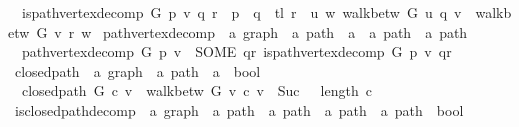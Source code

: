 \begin{isabellebody}
\ \ {\isachardoublequoteopen}is{\isacharunderscore}{\kern0pt}path{\isacharunderscore}{\kern0pt}vertex{\isacharunderscore}{\kern0pt}decomp\ G\ p\ v\ {\isacharparenleft}{\kern0pt}q{\isacharcomma}{\kern0pt}\ r{\isacharparenright}{\kern0pt}\ {\isasymlongleftrightarrow}\ p\ {\isacharequal}{\kern0pt}\ q\ {\isacharat}{\kern0pt}\ tl\ r\ {\isasymand}\ {\isacharparenleft}{\kern0pt}{\isasymexists}u\ w{\isachardot}{\kern0pt}\ walk{\isacharunderscore}{\kern0pt}betw\ G\ u\ q\ v\ {\isasymand}\ walk{\isacharunderscore}{\kern0pt}betw\ G\ v\ r\ w{\isacharparenright}{\kern0pt}{\isachardoublequoteclose}\isanewline
\isanewline
{}\isamarkupfalse%
\ path{\isacharunderscore}{\kern0pt}vertex{\isacharunderscore}{\kern0pt}decomp\ {\isacharcolon}{\kern0pt}{\isacharcolon}{\kern0pt}\ {\isachardoublequoteopen}{\isacharprime}{\kern0pt}a\ graph\ {\isasymRightarrow}\ {\isacharprime}{\kern0pt}a\ path\ {\isasymRightarrow}\ {\isacharprime}{\kern0pt}a\ {\isasymRightarrow}\ {\isacharprime}{\kern0pt}a\ path\ {\isasymtimes}\ {\isacharprime}{\kern0pt}a\ path{\isachardoublequoteclose}\ \isanewline
\ \ {\isachardoublequoteopen}path{\isacharunderscore}{\kern0pt}vertex{\isacharunderscore}{\kern0pt}decomp\ G\ p\ v\ {\isasymequiv}\ SOME\ qr{\isachardot}{\kern0pt}\ is{\isacharunderscore}{\kern0pt}path{\isacharunderscore}{\kern0pt}vertex{\isacharunderscore}{\kern0pt}decomp\ G\ p\ v\ qr{\isachardoublequoteclose}\isanewline
\isanewline
{}\isamarkupfalse%
\ closed{\isacharunderscore}{\kern0pt}path\ {\isacharcolon}{\kern0pt}{\isacharcolon}{\kern0pt}\ {\isachardoublequoteopen}{\isacharprime}{\kern0pt}a\ graph\ {\isasymRightarrow}\ {\isacharprime}{\kern0pt}a\ path\ {\isasymRightarrow}\ {\isacharprime}{\kern0pt}a\ {\isasymRightarrow}\ bool{\isachardoublequoteclose}\ \isanewline
\ \ {\isachardoublequoteopen}closed{\isacharunderscore}{\kern0pt}path\ G\ c\ v\ {\isasymequiv}\ walk{\isacharunderscore}{\kern0pt}betw\ G\ v\ c\ v\ {\isasymand}\ Suc\ {}\ {\isacharless}{\kern0pt}\ length\ c{\isachardoublequoteclose}\isanewline
\isanewline
{}\isamarkupfalse%
\ is{\isacharunderscore}{\kern0pt}closed{\isacharunderscore}{\kern0pt}path{\isacharunderscore}{\kern0pt}decomp\ {\isacharcolon}{\kern0pt}{\isacharcolon}{\kern0pt}\ {\isachardoublequoteopen}{\isacharprime}{\kern0pt}a\ graph\ {\isasymRightarrow}\ {\isacharprime}{\kern0pt}a\ path\ {\isasymRightarrow}\ {\isacharprime}{\kern0pt}a\ path\ {\isasymtimes}\ {\isacharprime}{\kern0pt}a\ path\ {\isasymtimes}\ {\isacharprime}{\kern0pt}a\ path\ {\isasymRightarrow}\ bool{\isachardoublequoteclose}\ \isanewline

\end{isabellebody}
